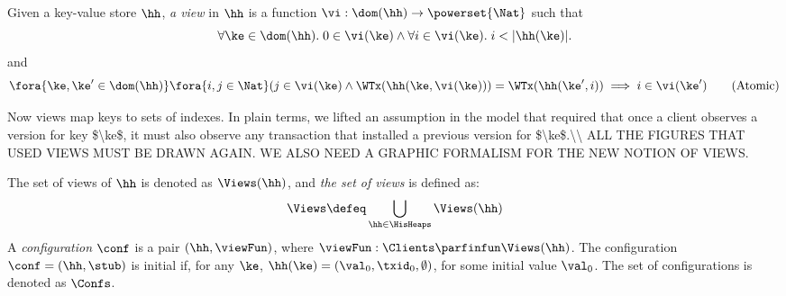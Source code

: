 \begin{definition}
\label{def:view}
\label{def:cuts}
\label{def:views}
\label{def:configuration}
Given a key-value store $\hh$, \emph{a view} in $\hh$ is a function  
$\vi: \dom(\hh) \to\powerset{\Nat}$ such that  
\[
\forall \ke \in \dom(\hh).\; 0 \in \vi(\ke) \wedge \forall i \in \vi(\ke).\; i < \lvert \hh(\ke) \rvert.
\]
and 
\begin{equation}
\label{eq:view.atomic}
\fora{ \ke,\ke' \in \dom(\hh)} \fora{ i,j \in \Nat} (j \in \vi(\ke) \wedge 
\WTx(\hh(\ke, \vi(\ke))) = \WTx(\hh(\ke', i)) \implies i \in \vi(\ke')
\tag{Atomic}
\end{equation}

\ac{Now views map keys to sets of indexes. In plain terms, we lifted 
an assumption in the model that required that once a client observes 
a version for key $\ke$, it must also observe any transaction that 
installed a previous version for $\ke$.\\
ALL THE FIGURES THAT USED VIEWS MUST BE DRAWN AGAIN. WE ALSO NEED A 
GRAPHIC FORMALISM FOR THE NEW NOTION OF VIEWS.}


The set of views of $\hh$ is denoted 
as $\Views(\hh)$, and \emph{the set of views} is defined as:
\[
\Views \defeq \bigcup_{\hh \in \HisHeaps} \Views(\hh)
\]
A \emph{configuration} $\conf$ is a pair $(\hh, \viewFun)$, where $\viewFun: 
\Clients \parfinfun \Views(\hh)$. The configuration $\conf = (\hh, \stub)$ is 
initial if, for any $\ke$, $\hh(\ke) = (\val_0, \txid_0, \emptyset)$, for some 
initial value $\val_0$. The set of configurations is denoted as 
$\Confs$.
\end{definition}

